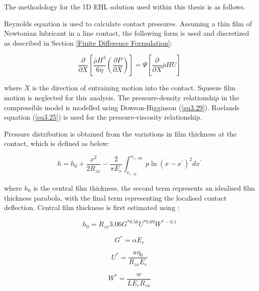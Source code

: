 The methodology for the 1D EHL solution used within this thesis is as follows.

Reynolds equation is used to calculate contact pressures. Assuming a thin film of Newtonian lubricant in a line contact, the following form is used and discretized as described in Section \ref{Finite Difference Formulation}:

\begin{equation}\label{eq3.33}
	\frac{\partial}{\partial X}\left[\frac{\bar{\rho} H^3}{6 \bar{\eta}}\left(\frac{\partial P}{\partial X}\right)\right]=\Psi\left[\frac{\partial}{\partial X} \bar{\rho} H U\right]
\end{equation}

where $X$ is the direction of entraining motion into the contact. Squeeze film motion is neglected for this analysis. The pressure-density relationship in the compressible model is modelled using Dowson-Higginson \cite{Dowson1977} (\ref{eq3.29}). Roelands equation \cite{Roelands1966} (\ref{eq3.25}) is used for the pressure-viscosity relationship.

Pressure distribution is obtained from the variations in film thickness at the contact, which is defined as below:

\begin{equation}\label{eq3.34}
	h=h_0+\frac{x^2}{2 R_{z x}}-\frac{2}{\pi E_r} \int_{x_{c, \text { in }}}^{x_{c, \text { out }}} p \ln \left(x-x^{\prime}\right)^2 d x^{\prime}
\end{equation}

where $h_0$ is the central film thickness, the second term represents an idealised film thickness parabola, with the final term representing the localised contact deflection. Central film thickness is first estimated using \cite{Dowson1979}:

\begin{equation}\label{eq3.35}
	h_0=R_{z x} 3.06 G^{* 0.56} U^{* 0.69} W^{*-0.1}
\end{equation}

\begin{equation}\label{eq3.36}
	G^*=\alpha E_r 
\end{equation}

\begin{equation}\label{eq3.37}
	U^*=\frac{u \eta_0}{R_{z x} E_r}
\end{equation}

\begin{equation}\label{eq3.38}
	W^*=\frac{w}{L E_r R_{z x}}
\end{equation}

